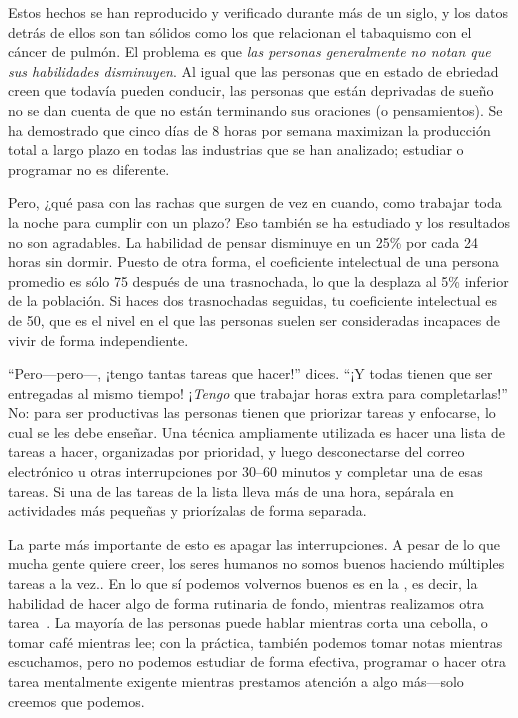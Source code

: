 Estos hechos se han reproducido y verificado durante más de un siglo,
y los datos detrás de ellos son tan sólidos como los que relacionan el tabaquismo con el cáncer de pulmón.
El problema es que
\emph{las personas generalmente no notan que sus habilidades disminuyen}.
Al igual que las personas que en estado de ebriedad creen que todavía pueden conducir,
las personas que están deprivadas de sueño no se dan cuenta de que
no están terminando sus oraciones (o pensamientos).
Se ha demostrado que cinco días de 8 horas por semana maximizan la producción total a largo plazo
en todas las industrias que se han analizado;
estudiar o programar no es diferente.

Pero, ¿qué pasa con las rachas que surgen de vez en cuando,
como trabajar toda la noche para cumplir con un plazo?
Eso también se ha estudiado
y los resultados no son agradables.
La habilidad de pensar disminuye en un 25\% por cada 24 horas sin dormir.
Puesto de otra forma,
el coeficiente intelectual de una persona promedio es sólo 75 después de una trasnochada,
lo que la desplaza al 5\% inferior de la población.
Si haces dos trasnochadas seguidas, tu coeficiente intelectual es de 50,
que es el nivel en el que las personas suelen ser consideradas incapaces de vivir de forma independiente.

``Pero---pero---, ¡tengo tantas tareas que hacer!'' dices.
``¡Y todas tienen que ser entregadas al mismo tiempo!
¡\emph{Tengo} que trabajar horas extra para completarlas!''
No:
para ser productivas las personas tienen que priorizar tareas y enfocarse,
lo cual se les debe enseñar.
Una técnica ampliamente utilizada es hacer una lista de tareas a hacer,
organizadas por prioridad,
y luego desconectarse del correo electrónico u otras interrupciones por 30--60 minutos
y completar una de esas tareas.
Si una de las tareas de la lista lleva más de una hora,
sepárala en actividades más pequeñas y priorízalas de forma separada.

La parte más importante de esto es apagar las interrupciones.
A pesar de lo que mucha gente quiere creer,
los seres humanos no somos buenos haciendo múltiples tareas a la vez..
En lo que sí podemos volvernos buenos es en la , es decir, 
la habilidad de hacer algo de forma rutinaria de fondo,
mientras realizamos otra tarea~\cite{Mill2016a}.
La mayoría de las personas puede hablar mientras corta una cebolla,
o tomar café mientras lee;
con la práctica,
también podemos tomar notas mientras escuchamos,
pero no podemos estudiar de forma efectiva,
programar
o hacer otra tarea mentalmente exigente mientras prestamos atención a algo más---solo
creemos que podemos.

